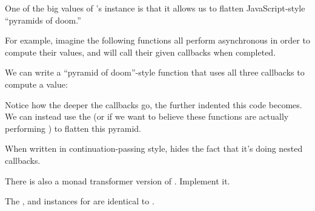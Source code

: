 \documentclass[book.tex]{subfiles}
\begin{document}
One of the big values of 's  instance is that it allows us to
flatten JavaScript-style ``pyramids of doom.''

For example, imagine the following functions all perform asynchronous  in
order to compute their values, and will call their given callbacks when
completed.


We can write a ``pyramid of doom''-style function that uses all three callbacks
to compute a value:


Notice how the deeper the callbacks go, the further indented this code becomes.
We can instead use the  (or  if we want to believe these
functions are actually performing ) to flatten this pyramid.


When written in continuation-passing style,  hides the
fact that it's doing nested callbacks.

\begin{exercise}
There is also a monad transformer version of . Implement it.
\end{exercise}
\begin{solution}

  The ,  and  instances for  are
  identical to .
\end{solution}
\end{document}
